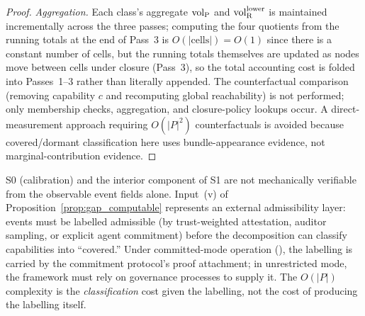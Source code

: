 \begin{proof}
\emph{Aggregation.}
Each class's aggregate ${\operatorname{vol}_{\mathrm{P}}}$ and ${\operatorname{vol}_{\mathrm{R}}^{\mathrm{lower}}}$ is maintained
incrementally across the three passes; computing the four
quotients from the running totals at the end of Pass~3 is
$O(|\mathrm{cells}|) = O(1)$ since there is a constant number
of cells, but the running totals themselves are updated as
nodes move between cells under closure (Pass~3), so the
total accounting cost is folded into Passes~1--3 rather than
literally appended.  The counterfactual
comparison (removing capability $c$ and recomputing global
reachability) is not performed; only membership checks,
aggregation, and closure-policy lookups occur.  A
direct-measurement approach requiring $O(|P|^2)$ counterfactuals
is avoided because covered/dormant classification here uses
bundle-appearance evidence, not marginal-contribution evidence.
\end{proof}

\begin{remark}
\label{rem:admissibility_external}
S0 (calibration) and the interior component of S1 are not
mechanically verifiable from the observable event fields alone.
Input~(v) of Proposition~\ref{prop:gap_computable} represents an
external admissibility layer: events must be labelled admissible
(by trust-weighted attestation, auditor sampling, or explicit
agent commitment) before the decomposition can classify
capabilities into ``covered.''  Under committed-mode operation
(\citep[Revealed~Sacrifice]{lasser2026paper8a}), the labelling is carried by the
commitment protocol's proof attachment; in unrestricted mode, the
framework must rely on governance processes to supply it.  The
$O(|P|)$ complexity is the \emph{classification} cost given the
labelling, not the cost of producing the labelling itself.
\end{remark}

